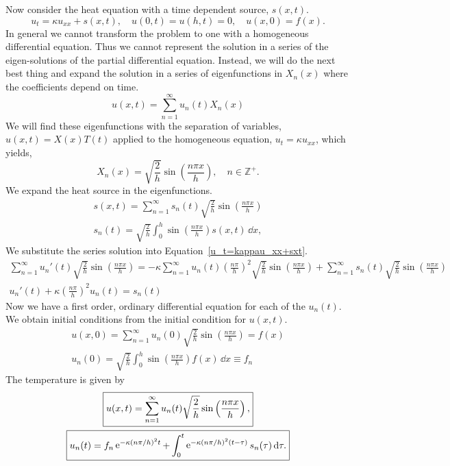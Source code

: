 Now consider the heat equation with a time dependent source, $s(x,t)$.
\begin{equation}
  \label{u_t=kappau_xx+sxt}
  u_t = \kappa u_{xx} + s(x,t), \quad u(0,t) = u(h,t) = 0, \quad u(x,0)=f(x). 
\end{equation}
In general we cannot transform the problem to one with a homogeneous
differential equation.  Thus we cannot represent the solution in a series
of the eigen-solutions of the partial differential equation.  Instead, 
we will do the next best thing and expand the solution in a series
of eigenfunctions in $X_n(x)$ where the coefficients depend on time.
\[
u(x,t) = \sum_{n=1}^\infty u_n(t) X_n(x)
\]
We will find these eigenfunctions with the separation of variables, 
$u(x,t) = X(x) T(t)$ applied to the homogeneous equation, 
$u_t = \kappa u_{x x}$, which  yields,
\[
X_n(x) = \sqrt{ \frac{2}{h} } \sin \left( \frac{n \pi x}{h} \right), 
\quad n \in \mathbb{Z}^+.
\]
We expand the heat source in the eigenfunctions.
\begin{gather*}
  s(x,t) = \sum_{n=1}^\infty s_n(t) \sqrt{ \frac{2}{h} }
  \sin \left( \frac{n \pi x}{h} \right) \\
  s_n(t) = \sqrt{ \frac{2}{h} } \int_0^h 
  \sin \left( \frac{n \pi x}{h}\right) s(x,t) \,\dd x,
\end{gather*}
We substitute the series solution into Equation~\ref{u_t=kappau_xx+sxt}.
\begin{gather*}
  \sum_{n=1}^\infty u_n'(t) \sqrt{ \frac{2}{h} } \sin \left( \frac{n \pi x}{h} \right)
  = - \kappa \sum_{n=1}^\infty u_n(t) \left( \frac{n \pi}{h} \right)^2 
  \sqrt{ \frac{2}{h} } \sin \left( \frac{n \pi x}{h} \right)
  + \sum_{n=1}^\infty s_n(t) \sqrt{ \frac{2}{h} }
  \sin \left( \frac{n \pi x}{h} \right) \\
  u_n'(t) + \kappa \left( \frac{n \pi}{h} \right)^2 u_n(t) = s_n(t)
\end{gather*}
Now we have a first order, ordinary differential equation for each of the 
$u_n(t)$.  We obtain initial conditions from the initial condition 
for $u(x,t)$.
\begin{gather*}
  u(x,0) = \sum_{n=1}^\infty u_n(0) \sqrt{ \frac{2}{h} }
  \sin \left( \frac{n \pi x}{h} \right) = f(x) \\
  u_n(0) = \sqrt{ \frac{2}{h} } \int_0^h 
  \sin \left( \frac{n \pi x}{h} \right) f(x) \,\dd x
  \equiv f_n
\end{gather*}
The temperature is given by
\begin{gather*}
  \boxed{
    u(x,t) = \sum_{n=1}^\infty u_n(t) \sqrt{ \frac{2}{h} } 
    \sin \left( \frac{n \pi x}{h} \right), 
    } \\
  \boxed{
    u_n(t) = f_n \mathop{\mathrm{e}}\nolimits^{- \kappa (n \pi/h)^2 t} + 
    \int_0^t \mathop{\mathrm{e}}\nolimits^{ -\kappa (n \pi/h)^2 (t - \tau)} s_n(\tau) \,\mathrm{d} \tau.
    }
\end{gather*}









